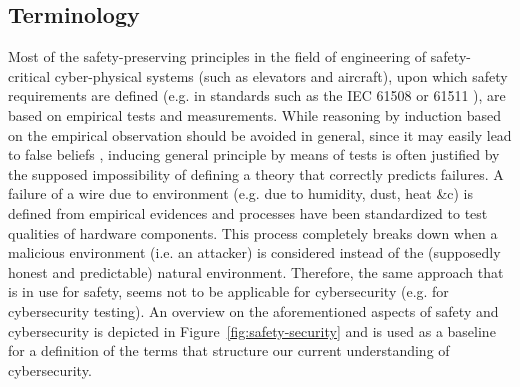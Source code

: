 \documentclass[conference]{IEEEtran}
\begin{document}
\subsection{Terminology}
Most of the safety-preserving principles in the field of engineering of
safety-critical cyber-physical systems (such as elevators and aircraft), upon
which safety requirements are defined (e.g. in standards such as the IEC 61508
or 61511 \autocite{IEC201761511}), are based on empirical tests and measurements.
While reasoning by induction
based on the empirical observation should be avoided in general,
since it may easily lead to false beliefs \autocite{Popper1959logic}, 
inducing general principle by means of tests
is often justified by the supposed impossibility of defining a theory
that correctly predicts failures.
A failure of a wire due to environment (e.g. due to humidity,
dust, heat \&c) is defined from empirical evidences and processes have been
standardized to test qualities of hardware components.  This process completely
breaks down when a malicious environment (i.e. an attacker) is considered
instead of the (supposedly honest and predictable) natural environment.
Therefore, the same approach that is in use for safety, seems not to be
applicable for cybersecurity (e.g. for cybersecurity testing).  An overview on the
aforementioned aspects of safety and cybersecurity is depicted in
Figure~\ref{fig:safety-security} and is used as a baseline for a definition of
the terms that structure our current understanding of cybersecurity.
 
\end{document}
